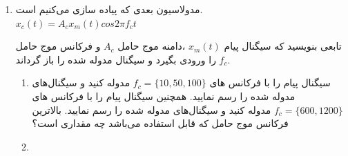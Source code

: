 \documentclass[14pt, professionalfont]{article}
\begin{document}
\begin{enumerate}
	
	
	
	\item
	مدولاسیون بعدی که پیاده سازی می‌کنیم 
	\:
	\:
	است.
	$x_c(t) = A_c x_m(t) cos 2\pi f_c t\qquad \qquad \qquad \qquad \qquad$
	
	تابعی بنویسید که سیگنال پیام 
	\:
	$x_m(t)$
	\:
	،دامنه موج حامل 
	\:
	$A_c$
	\:
	و فرکانس موج حامل 
	\:
	$f_c$
	\:
	را ورودی بگیرد و سیگنال مدوله شده را باز گرداند.
	\begin{enumerate}
		\item
		سیگنال پیام را با فرکانس های 
		$f_c = \{10,50,100\}$
		مدوله کنید و سیگنال‌های مدوله شده را رسم نمایید. همچنین سیگنال پیام را با فرکانس های 
		$f_c = \{600 , 1200\}$
		مدوله کنید و سیگنال‌های مدوله شده را رسم نمایید. بالاترین فرکانس موج حامل که قابل استفاده می‌باشد چه مقداری است؟‌
		\item 
		

\end{enumerate}
\end{enumerate}
\end{document}
